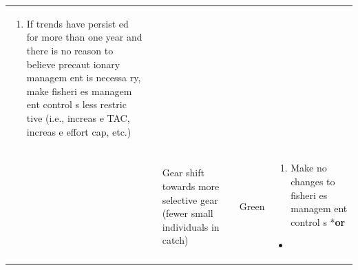 \documentclass[]{book}
\providecommand{\tightlist}{%
  \setlength{\itemsep}{0pt}\setlength{\parskip}{0pt}}
\begin{document}
\begin{longtable}[]{@{}lllll@{}}
\begin{minipage}[t]{0.19\columnwidth}
\begin{enumerate}
\def\labelenumi{\arabic{enumi}.}
\setcounter{enumi}{1}
\tightlist
\item
  If trends have persist ed for more than one year and there is no
  reason to believe precaut ionary managem ent is necessa ry, make
  fisheri es managem ent control s less restric tive (i.e., increas e
  TAC, increas e effort cap, etc.)
\end{enumerate}\strut
\end{minipage}\tabularnewline
\begin{minipage}[t]{0.19\columnwidth}\raggedright\strut
\strut
\end{minipage} & \begin{minipage}[t]{0.19\columnwidth}\raggedright\strut
\strut
\end{minipage} & \begin{minipage}[t]{0.19\columnwidth}\raggedright\strut
Gear shift towards more selective gear (fewer small individuals in
catch)\strut
\end{minipage} & \begin{minipage}[t]{0.19\columnwidth}\raggedright\strut
Green\strut
\end{minipage} & \begin{minipage}[t]{0.19\columnwidth}\raggedright\strut
\begin{enumerate}
\def\labelenumi{\arabic{enumi}.}
\tightlist
\item
  Make no changes to fisheri es managem ent control s *\textbf{or}
\end{enumerate}

\begin{itemize}
\item
\end{itemize}


\end{minipage}
\end{longtable}
\end{document}
